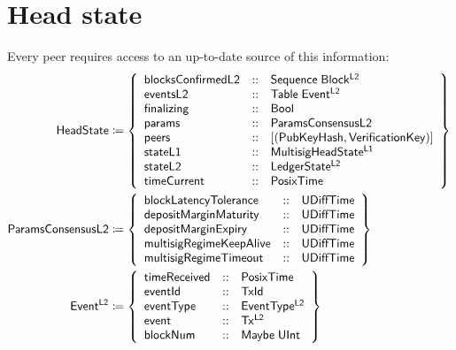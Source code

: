 \documentclass[../hydrozoa.tex]{subfiles}
\begin{document}
\section{Head state}%
\label{h:l2-head-state}%

Every peer requires access to an up-to-date source of this information:
\begin{equation*}
\begin{split}
  \headStateTypeName{} &\coloneq \headStateTypeBody{} \\
  \paramsConsensusTypeName{} &\coloneq \paramsConsensusTypeBody{} \\
  \T{Event^{L2}} &\coloneq \left\{
    \begin{array}{lll}
      \T{timeReceived} &::& \T{PosixTime} \\
      \T{eventId} &::& \T{TxId} \\
      \T{eventType} &::& \T{EventType^{L2}} \\
      \T{event} &::& \T{Tx^{L2}} \\
      \T{blockNum} &::& \T{Maybe} \; \T{UInt}
    \end{array}\right\} \\
\end{split}
\end{equation*}
\end{document}
